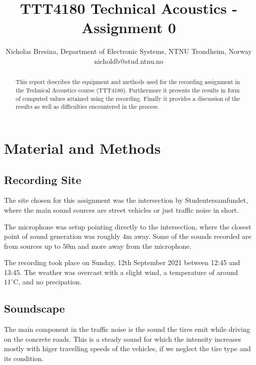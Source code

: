 \documentclass[twocolumn]{article}
\begin{document}
\title{TTT4180 Technical Acoustics - Assignment 0}

\author{Nicholas Bresina, Department of Electronic Systems, NTNU Trondheim, Norway \\
nicholdb@stud.ntnu.no}

\maketitle\thispagestyle{empty}

\begin{abstract}
This report describes the equipment and methods used for the recording assignment in the Technical
Acoustics course (TTT4180).
Furthermore it presents the results in form of computed values attained using the recording.
Finally it provides a discussion of the results as well as difficulties encountered in the process.
\end{abstract}

\section{Material and Methods}
\subsection{Recording Site}
The site chosen for this assignment was the intersection by Studentersamfundet, where the main sound sources
are street vehicles or just traffic noise in short.

The microphone was setup pointing directly to the intersection, where the closest point of sound generation
was roughly $4\textrm{m}$ away.
Some of the sounds recorded are from sources up to $50\textrm{m}$ and more away from the microphone.

The recording took place on Sunday, 12th September 2021 between 12:45 and 13:45.
The weather was overcast with a slight wind, a temperature of around $11^\circ\textrm{C}$,
and no precipation.

\subsection{Soundscape}
The main component in the traffic noise is the sound the tires emit while driving on the concrete roads.
This is a steady sound for which the intensity increases mostly with higer travelling speeds of the vehicles,
if we neglect the tire type and its condition.
\end{document}
